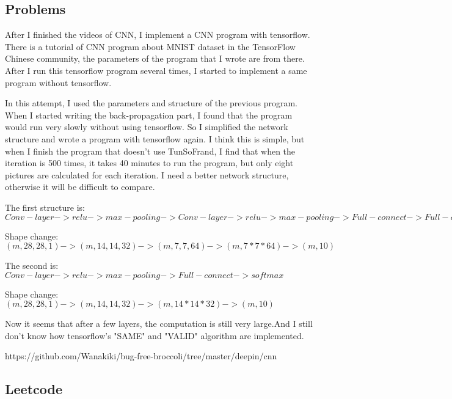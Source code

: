 \documentclass[10pt]{article}
\begin{document}
    \subsection*{Problems}
        After I finished the videos of CNN, I implement a CNN program with tensorflow. There is a tutorial of CNN program about MNIST dataset in the TensorFlow Chinese community, the parameters of the program that I wrote are from there. After I run this tensorflow program several times, I started to implement a same program without tensorflow. \vspace{2ex}
        
        \noindent
        In this attempt, I used the parameters and structure of the previous program. When I started writing the back-propagation part, I found that the program would run very slowly without using tensorflow. So I simplified the network structure and wrote a program with tensorflow again. I think this is simple, but when I finish the program that doesn't use TunSoFrand, I find that when the iteration is 500 times, it takes 40 minutes to run the program, but only eight pictures are calculated for each iteration. I need a better network structure, otherwise it will be difficult to compare.

        The first structure is: $Conv-layer -> relu -> max-pooling -> Conv-layer -> relu -> max-pooling -> Full-connect -> Full-connect ->softmax$

        Shape change:$(m, 28, 28, 1) -> (m, 14, 14, 32) -> (m, 7, 7, 64) -> (m, 7*7*64) -> (m, 10)$\vspace{2ex}

        The second is: $Conv-layer -> relu -> max-pooling -> Full-connect -> softmax$

        Shape change:$(m, 28, 28, 1) -> (m, 14, 14, 32) -> (m, 14*14*32) -> (m, 10)$\vspace{2ex}
        
        \noindent
        Now it seems that after a few layers, the computation is still very large.And I still don't know how tensorflow's "SAME" and "VALID" algorithm are implemented.\vspace{2ex}


        \noindent
        https://github.com/Wanakiki/bug-free-broccoli/tree/master/deepin/cnn
    
    \newpage
    \begin{center}
        \section*{Leetcode}
    \end{center}
\end{document}
